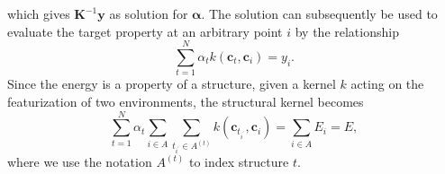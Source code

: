 which gives $\mathbf{K}^{-1}\mathbf{y}$ as solution for $\boldsymbol{\alpha}$.
The solution can subsequently be used to evaluate the target property at an arbitrary point $i$ by the relationship
\begin{equation}
  \label{eq:kernel_evaluation}
  \sum_{t=1}^N \alpha_t k(\mathbf{c}_t, \mathbf{c}_i) = y_i.
\end{equation}
Since the energy is a property of a structure, given a kernel $k$ acting on the featurization of two environments, the structural kernel becomes 
\begin{equation}
  \label{eq:kernel_evaluatio_ID1}
  \sum_{t=1}^N \alpha_t \sum_{i\in A} \sum_{t_{i^\prime}\in A^{(t)}} k(\mathbf{c}_{t_{i^\prime}}, \mathbf{c}_{i}) = \sum_{i\in A} E_{i} = E,
\end{equation}
where we use the notation $A^{(t)}$ to index structure $t$.
